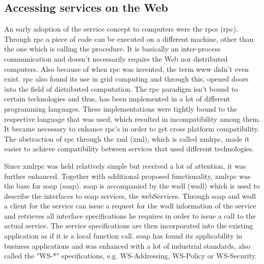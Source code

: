 \subsection{Accessing services on the Web}
An early adoption of the service concept to computers were the \textrm{\acrlong{rpc}s (\acrshort{rpc})}\cite{Birrell:1984:IRP:2080.357392}.
Through \textrm{\acrshort{rpc}} a piece of code can be executed on a different machine, other than the one which is calling the procedure.
It is basically an inter-process communication and doesn't necessarily require the Web nor distributed computers.
Also because of when \textrm{\acrshort{rpc}} was invented, the term \textrm{\gls{www}} didn't even exist. 
\textrm{\acrshort{rpc}} also found its use in grid computing\cite{seymour2002overview} and through this, opened doors into the field of distributed computation.
The \textrm{\acrshort{rpc}} paradigm isn't bound to certain technologies and thus, has been implemented in a lot of different programming languages.
These implementations were tightly bound to the respective language that was used, which resulted in incompatibility among them.
It became necessary to enhance \textrm{\acrshort{rpc}}'s in order to get cross platform compatibility.
The abstraction of \textrm{\acrshort{rpc}} through the \textrm{\acrlong{xml}} (\textrm{\acrshort{xml}})\cite{bray1998extensible}, which is called \textrm{\acrshort{xmlrpc}}, made it easier to achieve compatibility between services that used different technologies.

Since \textrm{\acrshort{xmlrpc}} was held relatively simple but received a lot of attention, it was further enhanced.
Together with additional proposed functionality, \textrm{\acrshort{xmlrpc}} was the base for \textrm{\acrlong{soap}} (\textrm{\acrshort{soap}})\cite{box2000simple}.
\textrm{\acrshort{soap}} is accompanied by the \textrm{\acrlong{wsdl} (\acrshort{wsdl})}\cite{christensen2001web} which is used to describe the interfaces to \acrshort{soap} services, the \textrm{\glspl{webService}}.
Through \textrm{\acrshort{soap}} and \textrm{\acrshort{wsdl}} a client for the service can issue a request for the \textrm{\acrshort{wsdl}} information of the service and retrieves all interface specifications he requires in order to issue a call to the actual service.
The service specifications are then incorporated into the existing application as if it is a local function call.
\textrm{\acrshort{soap}} has found its applicability in business applications\cite{journals/itpro/BarrosD06} and was enhanced with a lot of industrial standards, also called the "WS-*" specifications, e.g. WS-Addressing, WS-Policy or WS-Security.

